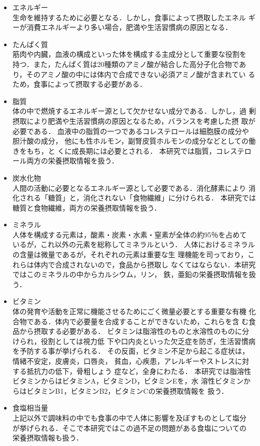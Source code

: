 \documentclass[11pt,titlepage,uplatex]{ujreport}
\begin{document}
\begin{itemize}
\item{エネルギー}\\
     生命を維持するために必要となる．しかし，食事によって摂取したエネル
     ギーが消費エネルギーより多い場合，肥満や生活習慣病の原因となる．
\item{たんぱく質}\\
     筋肉や内臓，血液の構成といった体を構成する主成分として重要な役割を
     持つ．また，たんぱく質は20種類のアミノ酸が結合した高分子化合物であ
     り，そのアミノ酸の中には体内で合成できない必須アミノ酸が含まれてい
     るため，食事によって摂取する必要がある．
\item{脂質}\\
     体の中で燃焼するエネルギー源として欠かせない成分である．しかし，過
     剰摂取により肥満や生活習慣病の原因となるため，バランスを考慮した摂
     取が必要である．
     血液中の脂質の一つであるコレステロールは細胞膜の成分や胆汁酸の成分，
     他にも性ホルモン，副腎皮質ホルモンの成分などとしての働きをもち，と
     くに成長期には必要とされる．
     本研究では脂質，コレステロール両方の栄養摂取情報を扱う．
\item{炭水化物}\\
     人間の活動に必要となるエネルギー源として必要である．消化酵素により
     消化される「糖質」と，消化されない「食物繊維」に分けられる．
     本研究では糖質と食物繊維，両方の栄養摂取情報を扱う．
\item{ミネラル}\\
     人体を構成する元素は，酸素・炭素・水素・窒素が全体の約95％を占めて
     いるが，これ以外の元素を総称してミネラルという．
     人体におけるミネラルの含量は微量であるが，それぞれの元素は重要な生
     理機能を司っており，これらは体内で合成されないので，食品から摂取し
     なくてはならない．本研究ではこのミネラルの中からカルシウム，リン，
     鉄，亜鉛の栄養摂取情報を扱う．
\item{ビタミン}\\
     体の発育や活動を正常に機能させるためにごく微量必要とする重要な有機
     化合物である．体内で必要量を合成することができないため，これらを含
     む食品から摂取する必要がある．
     ビタミンは脂溶性のものと水溶性のものに分けられ，役割としては視力低
     下や口内炎といった欠乏症を防ぎ，生活習慣病を予防する事が挙げられる．
     その反面，ビタミン不足から起こる症状は，情緒不安定，皮膚炎，口唇炎，
     貧血，心疾患，アレルギーやストレスに対する抵抗力の低下，骨粗しょう
     症など，全身にわたる．
     本研究では脂溶性ビタミンからはビタミンA，ビタミンD，ビタミンEを，水
     溶性ビタミンからはビタミンB1，ビタミンB2，ビタミンCの栄養摂取情報を
     扱う．
\item{食塩相当量}\\
     上記以外で調味料の中でも食事の中で人体に影響を及ぼすものとして塩分
     が挙げられる．そこで本研究ではこの過不足の問題がある食塩についての
     栄養摂取情報も扱う．
\end{itemize}
\end{document}
